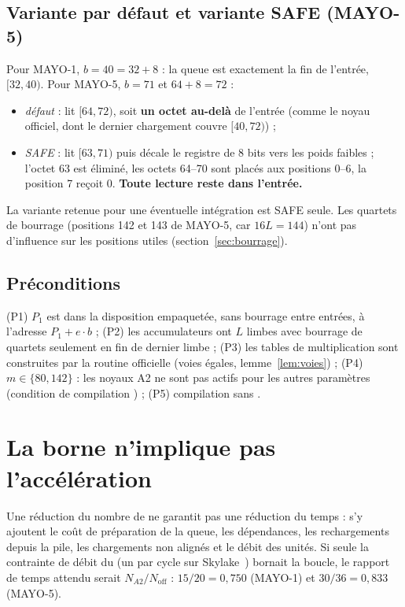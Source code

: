 \subsection{Variante par défaut et variante SAFE (MAYO-5)}
Pour MAYO-1, $b=40=32+8$ : la queue est exactement la fin de l'entrée, $[32,40)$. Pour MAYO-5, $b=71$ et $64+8=72$ :
\begin{itemize}[nosep]
\item \emph{défaut} : lit $[64,72)$, soit \textbf{un octet au-delà} de l'entrée (comme le noyau officiel, dont le dernier chargement couvre $[40,72)$) ;
\item \emph{SAFE} : lit $[63,71)$ puis décale le registre de 8 bits vers les poids faibles ; l'octet 63 est éliminé, les octets 64--70 sont placés aux positions 0--6, la position 7 reçoit 0. \textbf{Toute lecture reste dans l'entrée.}
\end{itemize}
La variante retenue pour une éventuelle intégration est SAFE seule. Les quartets de bourrage (positions 142 et 143 de MAYO-5, car $16L=144$) n'ont pas d'influence sur les positions utiles (section~\ref{sec:bourrage}).

\subsection{Préconditions}
(P1) $P_1$ est dans la disposition empaquetée, sans bourrage entre entrées, à l'adresse $P_1+e\cdot b$ ; (P2) les accumulateurs ont $L$ limbes avec bourrage de quartets seulement en fin de dernier limbe ; (P3) les tables de multiplication sont construites par la routine officielle (voies égales, lemme~\ref{lem:voies}) ; (P4) $m\in\{80,142\}$ : les noyaux A2 ne sont pas actifs pour les autres paramètres (condition de compilation ) ; (P5) compilation sans .

\section{La borne n'implique pas l'accélération}\label{sec:perfborne}
Une réduction du nombre de \vpshufb{} ne garantit pas une réduction du temps : s'y ajoutent le coût de préparation de la queue, les dépendances, les rechargements depuis la pile, les chargements non alignés et le débit des unités. Si seule la contrainte de débit du \vpshufb{} (un par cycle sur Skylake~\cite{nibbling}) bornait la boucle, le rapport de temps attendu serait $N_{A2}/N_{\mathrm{off}}$ : $15/20=0{,}750$ (MAYO-1) et $30/36=0{,}833$ (MAYO-5).

